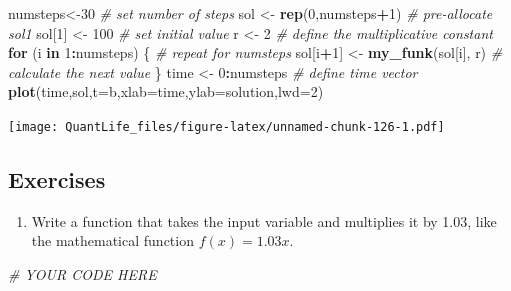 \documentclass[
]{book}
\newenvironment{Shaded}{\begin{snugshade}}{\end{snugshade}}
\newcommand{\CommentTok}[1]{\textcolor[rgb]{0.56,0.35,0.01}{\textit{#1}}}
\newcommand{\ControlFlowTok}[1]{\textcolor[rgb]{0.13,0.29,0.53}{\textbf{#1}}}
\newcommand{\DataTypeTok}[1]{\textcolor[rgb]{0.13,0.29,0.53}{#1}}
\newcommand{\DecValTok}[1]{\textcolor[rgb]{0.00,0.00,0.81}{#1}}
\newcommand{\KeywordTok}[1]{\textcolor[rgb]{0.13,0.29,0.53}{\textbf{#1}}}
\newcommand{\NormalTok}[1]{#1}
\newcommand{\OperatorTok}[1]{\textcolor[rgb]{0.81,0.36,0.00}{\textbf{#1}}}
\newcommand{\StringTok}[1]{\textcolor[rgb]{0.31,0.60,0.02}{#1}}
\providecommand{\tightlist}{%
  \setlength{\itemsep}{0pt}\setlength{\parskip}{0pt}}
\theoremstyle{definition}
\theoremstyle{definition}
\theoremstyle{definition}
\theoremstyle{remark}
\begin{document}
\begin{Shaded}
\begin{Highlighting}[]
\NormalTok{numsteps\textless{}{-}}\DecValTok{30} \CommentTok{\# set number of steps}
\NormalTok{sol \textless{}{-}}\StringTok{ }\KeywordTok{rep}\NormalTok{(}\DecValTok{0}\NormalTok{,numsteps}\OperatorTok{+}\DecValTok{1}\NormalTok{) }\CommentTok{\# pre{-}allocate sol1}
\NormalTok{sol[}\DecValTok{1}\NormalTok{] \textless{}{-}}\StringTok{ }\DecValTok{100} \CommentTok{\# set initial value}
\NormalTok{r \textless{}{-}}\StringTok{ }\DecValTok{2} \CommentTok{\# define the multiplicative constant}
\ControlFlowTok{for}\NormalTok{ (i }\ControlFlowTok{in} \DecValTok{1}\OperatorTok{:}\NormalTok{numsteps) \{ }\CommentTok{\# repeat for numsteps}
\NormalTok{  sol[i}\OperatorTok{+}\DecValTok{1}\NormalTok{] \textless{}{-}}\StringTok{ }\KeywordTok{my\_funk}\NormalTok{(sol[i], r) }\CommentTok{\# calculate the next value}
\NormalTok{\}}
\NormalTok{time \textless{}{-}}\StringTok{ }\DecValTok{0}\OperatorTok{:}\NormalTok{numsteps }\CommentTok{\# define time vector}
\KeywordTok{plot}\NormalTok{(time,sol,}\DataTypeTok{t=}\StringTok{\textquotesingle{}b\textquotesingle{}}\NormalTok{,}\DataTypeTok{xlab=}\StringTok{\textquotesingle{}time\textquotesingle{}}\NormalTok{,}\DataTypeTok{ylab=}\StringTok{\textquotesingle{}solution\textquotesingle{}}\NormalTok{,}\DataTypeTok{lwd=}\DecValTok{2}\NormalTok{)}
\end{Highlighting}
\end{Shaded}

\texttt{[image: QuantLife\_files/figure-latex/unnamed-chunk-126-1.pdf]}

\hypertarget{exercises-20}{%
\subsection{Exercises}\label{exercises-20}}

\begin{enumerate}
\def\labelenumi{\arabic{enumi}.}
\tightlist
\item
  Write a function that takes the input variable and multiplies it by 1.03, like the mathematical function \(f(x) = 1.03x\).
\end{enumerate}

\begin{Shaded}
\begin{Highlighting}[]
\CommentTok{\# YOUR CODE HERE}
\end{Highlighting}
\end{Shaded}
\end{document}
